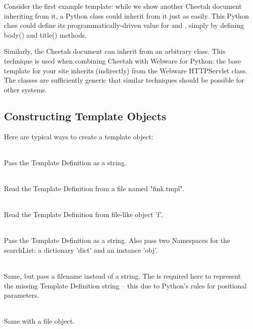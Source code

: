 Consider the first example template: while we show another Cheetah document
inheriting from it, a Python class could inherit from it just as easily. This
Python class could define its programmatically-driven value for 
and , simply by defining body() and title() methods.

Similarly, the Cheetah document can inherit from an arbitrary class. This
technique is used when combining Cheetah with Webware for Python: the base
template for your site inherits (indirectly) from the Webware HTTPServlet class.
The classes are sufficiently generic that similar techniques should be possible
for other systems.

\subsection{Constructing Template Objects}
\label{howWorks.constructing}


Here are typical ways to create a template object:
\begin{description}
\item{}
     \\ Pass the Template Definition as a string.
\item{}
     \\ Read the Template Definition from a file named "fink.tmpl".  
\item{}
     \\ Read the Template Definition from file-like object 'f'.
\item{}
     \\ Pass the Template Definition as a string.  Also pass two Namespaces for
     the searchList: a dictionary 'dict' and an instance 'obj'.
\item{}
     \\ Same, but pass a filename instead of a string.  The  is
     required here to represent the missing Template Definition string -- this
     due to Python's rules for positional parameters.
\item{}
     \\ Same with a file object.
\end{description}

